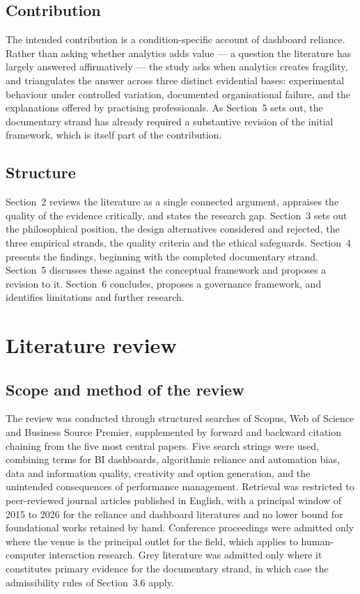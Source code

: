\documentclass[11pt,a4paper]{article}
\numberwithin{figure}{section}
\numberwithin{table}{section}
\begin{document}
\subsection{Contribution}

The intended contribution is a condition-specific account of dashboard reliance. Rather than asking whether
analytics adds value --- a question the literature has largely answered affirmatively --- the study asks
when analytics creates fragility, and triangulates the answer across three distinct evidential bases:
experimental behaviour under controlled variation, documented organisational failure, and the explanations
offered by practising professionals. As Section~5 sets out, the documentary strand has already required a
substantive revision of the initial framework, which is itself part of the contribution.

\subsection{Structure}

Section~2 reviews the literature as a single connected argument, appraises the quality of the evidence
critically, and states the research gap. Section~3 sets out the philosophical position, the design
alternatives considered and rejected, the three empirical strands, the quality criteria and the ethical
safeguards. Section~4 presents the findings, beginning with the completed documentary strand. Section~5
discusses these against the conceptual framework and proposes a revision to it. Section~6 concludes,
proposes a governance framework, and identifies limitations and further research.

\section{Literature review}

\subsection{Scope and method of the review}

The review was conducted through structured searches of Scopus, Web of Science and Business Source Premier,
supplemented by forward and backward citation chaining from the five most central papers. Five search
strings were used, combining terms for BI dashboards, algorithmic reliance and automation bias, data and
information quality, creativity and option generation, and the unintended consequences of performance
management. Retrieval was restricted to peer-reviewed journal articles published in English, with a
principal window of 2015 to 2026 for the reliance and dashboard literatures and no lower bound for
foundational works retained by hand. Conference proceedings were admitted only where the venue is the
principal outlet for the field, which applies to human-computer interaction research. Grey literature was
admitted only where it constitutes primary evidence for the documentary strand, in which case the
admissibility rules of Section~3.6 apply.
\end{document}
